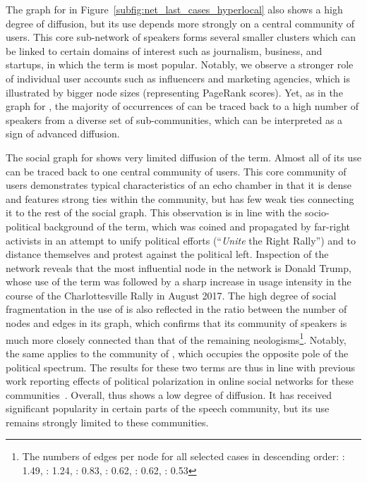 \documentclass[
  a4paper,
  abstract=on,
  captions=tableabove
  ]{scrartcl}
\begin{document}
      The graph for  in Figure~\ref{subfig:net_last_cases_hyperlocal} also shows a high degree of diffusion, but its use depends more strongly on a central community of users. This core sub-network of speakers forms several smaller clusters which can be linked to certain domains of interest such as journalism, business, and startups, in which the term is most popular. Notably, we observe a stronger role of individual user accounts such as influencers and marketing agencies, which is illustrated by bigger node sizes (representing  PageRank scores). Yet, as in the graph for , the majority of occurrences of  can be traced back to a high number of speakers from a diverse set of sub-communities, which can be interpreted as a sign of advanced diffusion.

      The social graph for  shows very limited diffusion of the term. Almost all of its use can be traced back to one central community of users. This core community of users demonstrates typical characteristics of an echo chamber in that it is dense and features strong ties within the community, but  has few weak ties connecting it to the rest of the social graph. This observation is in line with the socio-political background of the term, which was coined and propagated by far-right activists in an attempt to unify political efforts (\enquote{\emph{Unite} the Right Rally}) and to distance themselves and protest against the political left. Inspection of the network reveals that the most influential node in the network is Donald Trump, whose use of the term was followed by a sharp increase in usage intensity in the course of the Charlottesville Rally in August 2017. The high degree of social fragmentation in the use of  is also reflected in the ratio between the number of nodes and edges in its graph, which confirms that its community of speakers is much more closely connected than that of the remaining neologisms\footnote{The numbers of edges per node for all selected cases in descending order: : \num{1.49}, : \num{1.24}, : \num{0.83}, : \num{0.62}, : \num{0.62}, : \num{0.53}}. Notably, the same applies to the community of , which occupies the opposite pole of the political spectrum. The results for these two terms are thus in line with previous work reporting effects of political polarization in online social networks for these communities~\parencite{Sunstein2018RepublicDivided}. Overall,  thus shows a low degree of diffusion. It has received significant popularity in certain parts of the speech community, but its use remains strongly limited to these communities.
\end{document}

